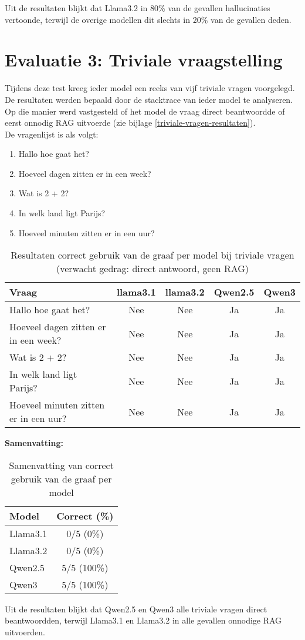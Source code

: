 Uit de resultaten blijkt dat Llama3.2 in 80\% van de gevallen hallucinaties vertoonde, terwijl de overige modellen dit slechts in 20\% van de gevallen deden.


\section{Evaluatie 3: Triviale vraagstelling}

Tijdens deze test kreeg ieder model een reeks van vijf triviale vragen voorgelegd. De resultaten werden bepaald door de stacktrace van ieder model te analyseren. Op die manier werd vastgesteld of het model de vraag direct beantwoordde of eerst onnodig RAG uitvoerde (zie bijlage \ref{triviale-vragen-resultaten}).
\\[1em]
De vragenlijst is als volgt:

\begin{enumerate}
    \item Hallo hoe gaat het?
    \item Hoeveel dagen zitten er in een week?
    \item Wat is 2 + 2?
    \item In welk land ligt Parijs?
    \item Hoeveel minuten zitten er in een uur?
\end{enumerate}

\begin{table}[H]
    \centering
    \begin{tabular}{|l|c|c|c|c|}
        \hline
        \textbf{Vraag} & \textbf{llama3.1} & \textbf{llama3.2} & \textbf{Qwen2.5} & \textbf{Qwen3} \\
        \hline
        Hallo hoe gaat het? & Nee & Nee & Ja & Ja \\
        Hoeveel dagen zitten er in een week? & Nee & Nee & Ja & Ja \\
        Wat is 2 + 2? & Nee & Nee & Ja & Ja \\
        In welk land ligt Parijs? & Nee & Nee & Ja & Ja \\
        Hoeveel minuten zitten er in een uur? & Nee & Nee & Ja & Ja \\
        \hline
    \end{tabular}
    \caption{Resultaten correct gebruik van de graaf per model bij triviale vragen (verwacht gedrag: direct antwoord, geen RAG)}
\end{table}

\noindent\textbf{Samenvatting:}  
\begin{table}[H]
    \begin{tabular}{|l|c|}
        \hline
        \textbf{Model} & \textbf{Correct (\%)} \\
        \hline
        Llama3.1 & 0/5 (0\%) \\
        Llama3.2 & 0/5 (0\%) \\
        Qwen2.5  & 5/5 (100\%) \\
        Qwen3    & 5/5 (100\%) \\
        \hline
    \end{tabular}
    \caption{Samenvatting van correct gebruik van de graaf per model}
\end{table}

Uit de resultaten blijkt dat Qwen2.5 en Qwen3 alle triviale vragen direct beantwoordden, terwijl Llama3.1 en Llama3.2 in alle gevallen onnodige RAG uitvoerden.

